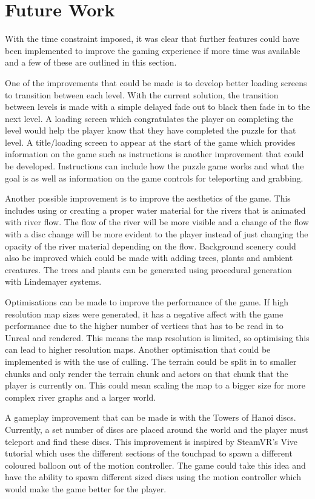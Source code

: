 \section{Future Work}
With the time constraint imposed, it was clear that further features could have been implemented to improve the gaming experience if more time was available and a few of these are outlined in this section.
\newline
\par
One of the improvements that could be made is to develop better loading screens to transition between each level. With the current solution, the transition between levels is made with a simple delayed fade out to black then fade in to the next level. A loading screen which congratulates the player on completing the level would help the player know that they have completed the puzzle for that level. A title/loading screen to appear at the start of the game which provides information on the game such as instructions is another improvement that could be developed. Instructions can include how the puzzle game works and what the goal is as well as information on the game controls for teleporting and grabbing.
\newline
\par
Another possible improvement is to improve the aesthetics of the game. This includes using or creating a proper water material for the rivers that is animated with river flow. The flow of the river will be more visible and a change of the flow with a disc change will be more evident to the player instead of just changing the opacity of the river material depending on the flow. Background scenery could also be improved which could be made with adding trees, plants and ambient creatures. The trees and plants can be generated using procedural generation with Lindemayer systems.
\newline
\par
Optimisations can be made to improve the performance of the game. If high resolution map sizes were generated, it has a negative affect with the game performance due to the higher number of vertices that has to be read in to Unreal and rendered. This means the map resolution is limited, so optimising this can lead to higher resolution maps. Another optimisation that could be implemented is with the use of culling. The terrain could be split in to smaller chunks and only render the terrain chunk and actors on that chunk that the player is currently on. This could mean scaling the map to a bigger size for more complex river graphs and a larger world.
\newline
\par
A gameplay improvement that can be made is with the Towers of Hanoi discs. Currently, a set number of discs are placed around the world and the player must teleport and find these discs. This improvement is inspired by SteamVR's Vive tutorial which uses the different sections of the touchpad to spawn a different coloured balloon out of the motion controller. The game could take this idea and have the ability to spawn different sized discs using the motion controller which would make the game better for the player.

